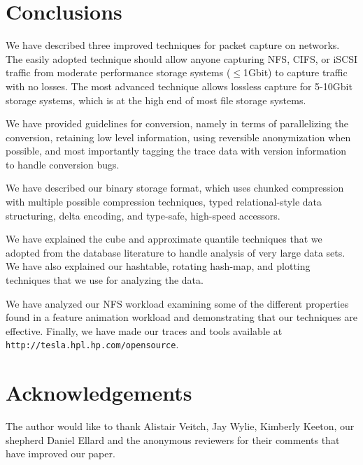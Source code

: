 \section{Conclusions}
\label{sec:conclusion}

We have described three improved techniques for packet capture on
networks.  The easily adopted technique should allow anyone capturing
NFS, CIFS, or iSCSI traffic from moderate performance storage systems
($\leq$1Gbit) to capture traffic with no losses.  The most advanced
technique allows lossless capture for 5-10Gbit storage systems, which
is at the high end of most file storage systems. 

We have provided guidelines for conversion, namely in terms of
parallelizing the conversion, retaining low level information, using
reversible anonymization when possible, and most importantly tagging
the trace data with version information to handle conversion bugs.

We have described our binary storage format, which uses chunked
compression with multiple possible compression techniques, 
typed relational-style data structuring, delta encoding,
and type-safe, high-speed accessors.

We have explained the cube and approximate quantile techniques that
we adopted from the database literature to handle analysis of very
large data sets.  We have also explained our hashtable, rotating
hash-map, and plotting techniques that we use for analyzing the data.

We have analyzed our NFS workload examining some of the different
properties found in a feature animation workload and demonstrating
that our techniques are effective.  Finally, we have made our traces
and tools available at {\tt http://tesla.hpl.hp.com/opensource}.

\section{Acknowledgements}

The author would like to thank Alistair Veitch, Jay Wylie, Kimberly
Keeton, our shepherd Daniel Ellard and the anonymous reviewers for
their comments that have improved our paper.
